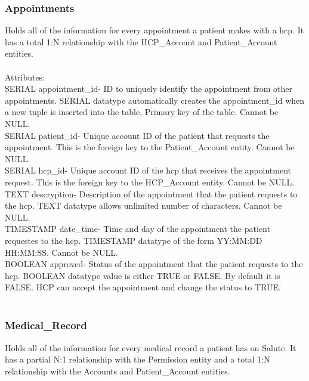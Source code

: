 \documentclass[12pt]{report}
\begin{document}
\subsubsection{Appointments}
Holds all of the information for every appointment a patient makes with a hcp.  It has a total 1:N relationship with the HCP\_Account and Patient\_Account entities.\\ \\

Attributes:\\
SERIAL appointment\_id- ID to uniquely identify the appointment from other appointments. SERIAL datatype automatically creates the appointment\_id when a new tuple is inserted into the table.  Primary key of the table.  Cannot be NULL.\\

SERIAL patient\_id-  Unique account ID of the patient that requests the appointment.  This is the foreign key to the Patient\_Account entity.  Cannot be NULL.\\

SERIAL hcp\_id- Unique account ID of the hcp that receives the appointment request.  This is the foreign key to the HCP\_Account entity.  Cannot be NULL.\\

TEXT descryption- Description of the appointment that the patient requests to the hcp.  TEXT datatype allows unlimited number of characters.  Cannot be NULL.\\

TIMESTAMP date\_time- Time and day of the appointment the patient requestes to the hcp.  TIMESTAMP datatype of the form YY:MM:DD HH:MM:SS.  Cannot be NULL.\\

BOOLEAN approved- Status of the appointment that the patient requests to the hcp.  BOOLEAN datatype value is either TRUE or FALSE.  By default it is FALSE.  HCP can accept the appointment and change the status to TRUE.\\ \\

\subsubsection{Medical\_Record}
Holds all of the information for every medical record a patient has on Salute.  It has a partial N:1 relationship with the Permission entity and a total 1:N relationship with the Accounts and Patient\_Account entities.\\ \\
\end{document}
